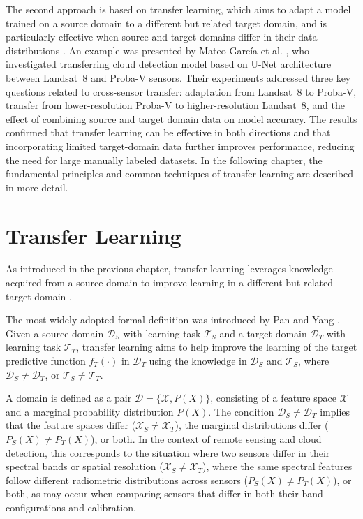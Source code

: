 The second approach is based on transfer learning, which aims to adapt a model trained on a source domain to a different but related target domain, and is particularly effective when source and target domains differ in their data distributions \cite{goodfellow2016}. An example was presented by Mateo-García et al. \cite{garcia2020}, who investigated transferring cloud detection model based on U-Net architecture between Landsat~8 and Proba-V sensors. Their experiments addressed three key questions related to cross-sensor transfer: adaptation from Landsat~8 to Proba-V, transfer from lower-resolution Proba-V to higher-resolution Landsat~8, and the effect of combining source and target domain data on model accuracy. The results confirmed that transfer learning can be effective in both directions and that incorporating limited target-domain data further improves performance, reducing the need for large manually labeled datasets. In the following chapter, the fundamental principles and common techniques of transfer learning are described in more detail.

\section{Transfer Learning}
\label{sec:theoretical_tl}
As introduced in the previous chapter, transfer learning leverages knowledge acquired from a source domain to improve learning in a different but related target domain \cite{goodfellow2016}.

The most widely adopted formal definition was introduced by Pan and Yang \cite{pan2010}. Given a source domain $\mathcal{D}_S$ with learning task $\mathcal{T}_S$ and a target domain $\mathcal{D}_T$ with learning task $\mathcal{T}_T$, transfer learning aims to help improve the learning of the target predictive function $f_T(\cdot)$ in $\mathcal{D}_T$ using the knowledge in $\mathcal{D}_S$ and $\mathcal{T}_S$, where $\mathcal{D}_S \neq \mathcal{D}_T$, or $\mathcal{T}_S \neq \mathcal{T}_T$. 

A domain is defined as a pair $\mathcal{D} =\{\mathcal{X}, P(X)\}$, consisting of a feature space $\mathcal{X}$ and a marginal probability distribution $P(X)$. The condition $\mathcal{D}_S \neq \mathcal{D}_T$ implies that the feature spaces differ ($\mathcal{X}_S \neq \mathcal{X}_T$), the marginal distributions differ ($P_S(X) \neq P_T(X)$), or both. In the context of remote sensing and cloud detection, this corresponds to the situation where two sensors differ in their spectral bands or spatial resolution ($\mathcal{X}_S \neq \mathcal{X}_T$), where the same spectral features follow different radiometric distributions across sensors ($P_S(X) \neq P_T(X)$), or both, as may occur when comparing sensors that differ in both their band configurations and calibration.


